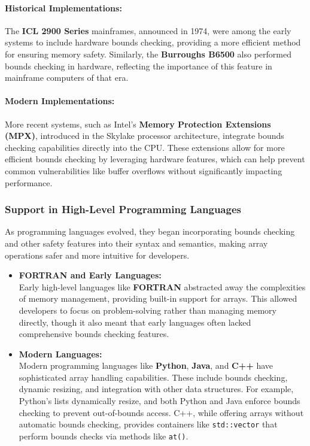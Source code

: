 \documentclass{book}
\begin{document}
\paragraph{Historical Implementations:}
The \textbf{ICL 2900 Series} mainframes, announced in 1974, were among the early systems to include hardware bounds checking, providing a more efficient method for ensuring memory safety. Similarly, the \textbf{Burroughs B6500} also performed bounds checking in hardware, reflecting the importance of this feature in mainframe computers of that era.

\paragraph{Modern Implementations:}
More recent systems, such as Intel's \textbf{Memory Protection Extensions (MPX)}, introduced in the Skylake processor architecture, integrate bounds checking capabilities directly into the CPU. These extensions allow for more efficient bounds checking by leveraging hardware features, which can help prevent common vulnerabilities like buffer overflows without significantly impacting performance.

\subsubsection{Support in High-Level Programming Languages}
As programming languages evolved, they began incorporating bounds checking and other safety features into their syntax and semantics, making array operations safer and more intuitive for developers.

\begin{itemize}
	\item \textbf{FORTRAN and Early Languages:}\\
	Early high-level languages like \textbf{FORTRAN} abstracted away the complexities of memory management, providing built-in support for arrays. This allowed developers to focus on problem-solving rather than managing memory directly, though it also meant that early languages often lacked comprehensive bounds checking features.
	
	\item \textbf{Modern Languages:}\\
	Modern programming languages like \textbf{Python}, \textbf{Java}, and \textbf{C++} have sophisticated array handling capabilities. These include bounds checking, dynamic resizing, and integration with other data structures. For example, Python's lists dynamically resize, and both Python and Java enforce bounds checking to prevent out-of-bounds access. C++, while offering arrays without automatic bounds checking, provides containers like \texttt{std::vector} that perform bounds checks via methods like \texttt{at()}.
\end{itemize}
\end{document}
